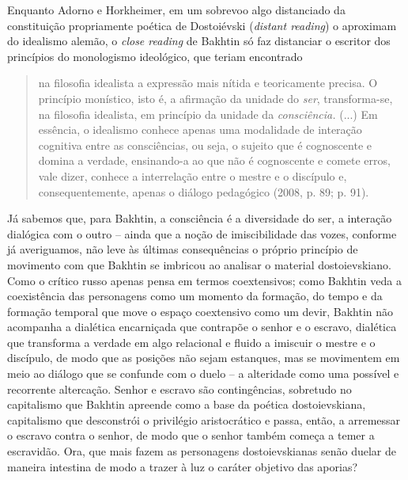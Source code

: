 Enquanto Adorno e Horkheimer, em um sobrevoo algo distanciado da
constituição propriamente poética de Dostoiévski (\emph{distant
reading}) o aproximam do idealismo alemão, o \emph{close reading} de
Bakhtin só faz distanciar o escritor dos princípios do monologismo
ideológico, que teriam encontrado

\begin{quote}
na filosofia idealista a expressão mais nítida e teoricamente precisa. O
princípio monístico, isto é, a afirmação da unidade do \emph{ser},
transforma-se, na filosofia idealista, em princípio da unidade da
\emph{consciência.} (...) Em essência, o idealismo conhece apenas uma
modalidade de interação cognitiva entre as consciências, ou seja, o
sujeito que é cognoscente e domina a verdade, ensinando-a ao que não é
cognoscente e comete erros, vale dizer, conhece a interrelação entre o
mestre e o discípulo e, consequentemente, apenas o diálogo pedagógico
(2008, p. 89; p. 91).
\end{quote}

Já sabemos que, para Bakhtin, a consciência é a diversidade do ser, a
interação dialógica com o outro -- ainda que a noção de imiscibilidade
das vozes, conforme já averiguamos, não leve às últimas consequências o
próprio princípio de movimento com que Bakhtin se imbricou ao analisar o
material dostoievskiano. Como o crítico russo apenas pensa em termos
coextensivos; como Bakhtin veda a coexistência das personagens como um
momento da formação, do tempo e da formação temporal que move o espaço
coextensivo como um devir, Bakhtin não acompanha a dialética encarniçada
que contrapõe o senhor e o escravo, dialética que transforma a verdade
em algo relacional e fluido a imiscuir o mestre e o discípulo, de modo
que as posições não sejam estanques, mas se movimentem em meio ao
diálogo que se confunde com o duelo -- a alteridade como uma possível e
recorrente altercação. Senhor e escravo são contingências, sobretudo no
capitalismo que Bakhtin apreende como a base da poética dostoievskiana,
capitalismo que desconstrói o privilégio aristocrático e passa, então, a
arremessar o escravo contra o senhor, de modo que o senhor também começa
a temer a escravidão. Ora, que mais fazem as personagens dostoievskianas
senão duelar de maneira intestina de modo a trazer à luz o caráter
objetivo das aporias?

